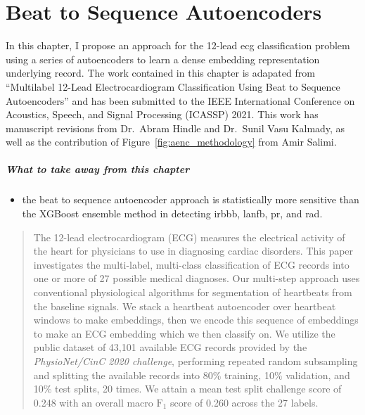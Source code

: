 \documentclass[\main/thesis.tex]{subfiles}
\begin{document}
\chapter{Beat to Sequence Autoencoders}
\label{chp:dl_autoenc}

In this chapter, I propose an approach for the 12-lead \gls{ecg} classification problem using a series of autoencoders to learn a dense embedding representation underlying record.
The work contained in this chapter is adapated from ``Multilabel 12-Lead Electrocardiogram Classification Using Beat to Sequence Autoencoders'' and has been submitted to the IEEE International Conference on Acoustics, Speech, and Signal Processing (ICASSP) 2021.
This work has manuscript revisions from Dr.\ Abram Hindle and Dr.\ Sunil Vasu Kalmady, as well as the contribution of Figure~\ref{fig:aenc_methodology} from Amir Salimi.

\paragraph{What to take away from this chapter}
\begin{itemize}
    \item the beat to sequence autoencoder approach is statistically more sensitive than the XGBoost ensemble method in detecting \gls{irbbb}, \gls{lanfb}, \gls{pr}, and \gls{rad}.
\end{itemize}



\begin{abstract}
The 12-lead electrocardiogram (ECG) measures the electrical activity of the heart for physicians to use in diagnosing cardiac disorders.
This paper investigates the multi-label, multi-class classification of ECG records into one or more of 27 possible medical diagnoses.
Our multi-step approach uses conventional physiological algorithms for segmentation of heartbeats from the baseline signals.
We stack a heartbeat autoencoder over heartbeat windows to make embeddings, then we encode this sequence of embeddings to make an ECG embedding which we then classify on.
We utilize the public dataset of 43,101 available ECG records provided by the \emph{PhysioNet/CinC 2020 challenge}, performing repeated random subsampling and splitting the available records into 80\% training, 10\% validation, and 10\% test splits, 20 times.
We attain a mean test split challenge score of 0.248 with an overall macro $\text{F}_1$ score of 0.260 across the 27 labels.
\end{abstract}
%
%
\end{document}
